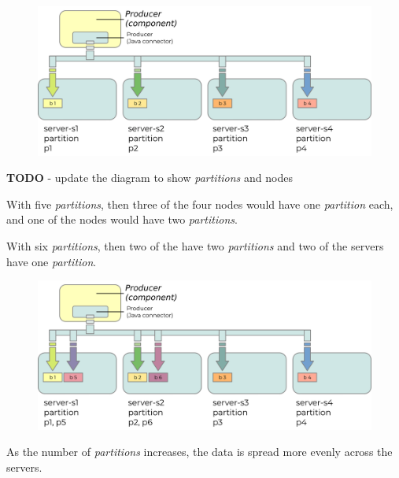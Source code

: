 \documentclass{article}
\newcommand{\kfpartition} {\textit{partition}\xspace}
\newcommand{\kfpartitions} {\textit{partitions}\xspace}
\newcommand{\javaname}[1] {{\ttfamily\color{codeblue} #1}}
\begin{document}
\begin{figure}[H]
\begin{center}
\includegraphics{images/kafka-partitions-06.png}
%
\label{fig:kafka-partitions-06}
\end{center}
\end{figure}

\textbf{TODO} - update the diagram to show \kfpartitions and nodes

With five \kfpartitions, then three of the four nodes would have one \kfpartition each, and one of the nodes would have two \kfpartitions.

With six \kfpartitions, then two of the have two \kfpartitions and two of the servers have one \kfpartition.

\begin{figure}[H]
\begin{center}
\includegraphics{images/kafka-partitions-08.png}
%
\label{fig:kafka-partitions-07}
\end{center}
\end{figure}

As the number of \kfpartitions increases, the data is spread more evenly across the servers.
\end{document}
